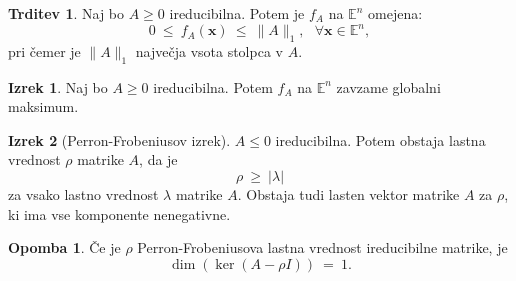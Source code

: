 \documentclass[11pt]{article}
\newcommand{\E}{\mathbb{E}}
\newcommand{\x}{\mathbf{x}}
\newcommand{\0}{\mathbf{0}}
\theoremstyle{definition}
\theoremstyle{definition}
\newtheorem{trditev}{Trditev}[section]
\theoremstyle{definition}
\newtheorem{izrek}{Izrek}[section]
\theoremstyle{definition}
\newtheorem*{opomba}{Opomba}
\begin{document}
\begin{trditev}

Naj bo $A \geq 0$ ireducibilna. Potem je $f_A$ na $\E^n$ omejena:
$$0 ~\leq~ f_A(\x) ~\leq~ \|A\|_1, ~~~\forall \x \in \E^n,$$
pri čemer je $\|A\|_1$ največja vsota stolpca v $A$.

\end{trditev}
\vspace{0.5cm}

\begin{izrek}

Naj bo $A \geq 0$ ireducibilna. Potem $f_A$ na $\E^n$ zavzame globalni maksimum.
\end{izrek}
\vspace{0.5cm}

\begin{izrek}[Perron-Frobeniusov izrek]

$A \leq 0$ ireducibilna. Potem obstaja lastna vrednost $\rho$ matrike $A$, da je 
$$\rho ~\geq~ |\lambda|$$
za vsako lastno vrednost $\lambda$ matrike $A$. Obstaja tudi lasten vektor matrike $A$ za $\rho$, ki ima vse komponente nenegativne.

\end{izrek}
\vspace{0.5cm}

\begin{opomba}

Če je $\rho$ Perron-Frobeniusova lastna vrednost ireducibilne matrike, je
$$\dim(\ker(A-\rho I)) ~=~ 1.$$

\end{opomba}
\vspace{0.5cm}


\pagebreak

\end{document}
